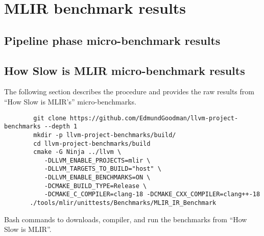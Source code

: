 \chapter{MLIR benchmark results}
\label{chap:mlir-benchmark-results}

\section{Pipeline phase micro-benchmark results}

\section{How Slow is MLIR micro-benchmark results}

The following section describes the procedure and provides the raw results from ``How Slow is MLIR's'' micro-benchmarks.

\vspace{2em}

\begin{code}
    \begin{verbatim}
        git clone https://github.com/EdmundGoodman/llvm-project-benchmarks --depth 1
        mkdir -p llvm-project-benchmarks/build/
        cd llvm-project-benchmarks/build
        cmake -G Ninja ../llvm \
           -DLLVM_ENABLE_PROJECTS=mlir \
           -DLLVM_TARGETS_TO_BUILD="host" \
           -DLLVM_ENABLE_BENCHMARKS=ON \
           -DCMAKE_BUILD_TYPE=Release \
           -DCMAKE_C_COMPILER=clang-18 -DCMAKE_CXX_COMPILER=clang++-18
       ./tools/mlir/unittests/Benchmarks/MLIR_IR_Benchmark
    \end{verbatim}
    \caption{Bash commands to downloads, compiler, and run the benchmarks from ``How Slow is MLIR''.}
    \label{listing:bash-mlir-ubench-run}
\end{code}

\vspace{2em}

